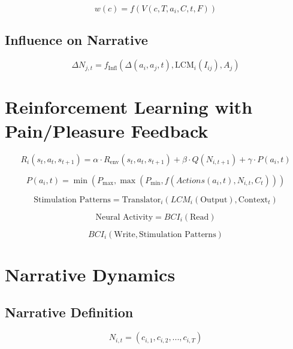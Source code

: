 \documentclass[12pt, a4paper]{article}
\begin{document}
\begin{equation}
w(c) = f(V(c, T, a_i, C, t, F))
\end{equation}


\subsection{Influence on Narrative}
\begin{equation}
\Delta N_{j,t} = f_{\text{Infl}}(\Delta(a_i, a_j, t), \text{LCM}_i(I_{ij}), A_j)
\end{equation}

\section{Reinforcement Learning with Pain/Pleasure Feedback}

\begin{equation}
R_i(s_t, a_t, s_{t+1}) = \alpha \cdot R_{\text{env}}(s_t, a_t, s_{t+1}) + \beta \cdot Q(N_{i,t+1}) + \gamma \cdot P(a_i, t)
\end{equation}

\begin{equation}
P(a_i, t) = \min(P_{\text{max}}, \max(P_{\text{min}}, f(Actions(a_i, t), N_{i,t}, C_t)))
\end{equation}

\begin{equation}
\text{Stimulation Patterns} = \text{Translator}_i(LCM_i(\text{Output}), \text{Context}_t)
\end{equation}

\begin{equation}
\text{Neural Activity} = BCI_i(\text{Read})
\end{equation}

\begin{equation}
BCI_i(\text{Write}, \text{Stimulation Patterns})
\end{equation}

\section{Narrative Dynamics}

\subsection{Narrative Definition}
\begin{equation}
N_{i,t} = (c_{i,1}, c_{i,2}, ..., c_{i,T})
\end{equation}
\end{document}
